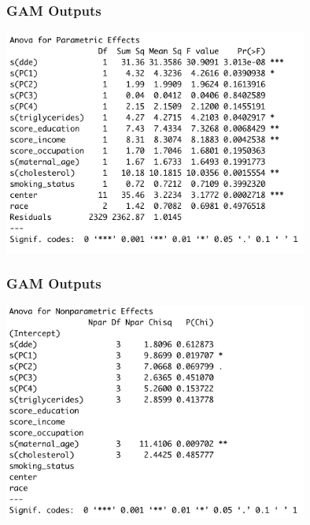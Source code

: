 \documentclass{beamer}
\begin{document}
\begin{frame}
\frametitle{GAM Outputs}
\centering
\includegraphics[width=10cm]{GAMOutputs1.png}
\end{frame}

\begin{frame}
\frametitle{GAM Outputs}
\centering
\includegraphics[width=10cm]{GAMOutputs2.png}
\end{frame}
\end{document}
